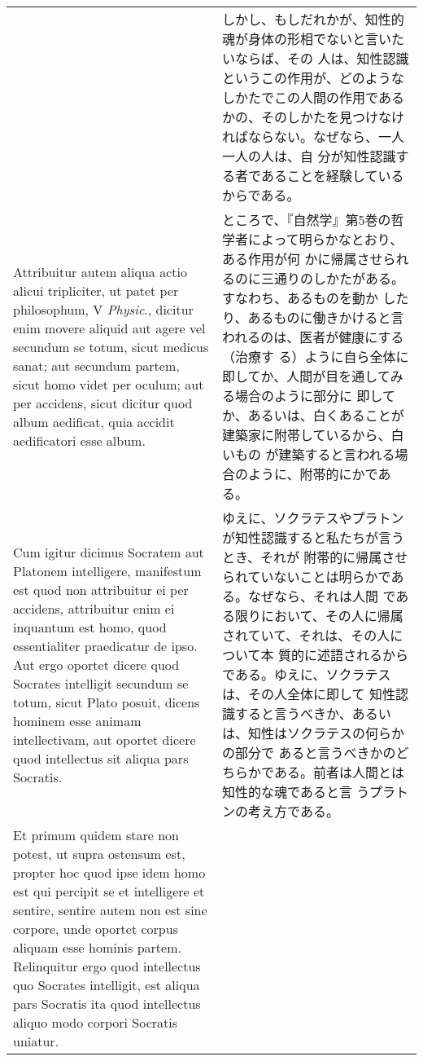 \documentclass[paper=a4paper,fontsize=10pt,jafontsize=9pt,titlepage]{jlreq}
\begin{document}
\begin{longtable}{p{21em}p{21em}}
 &

しかし、もしだれかが、知性的魂が身体の形相でないと言いたいならば、その
人は、知性認識というこの作用が、どのようなしかたでこの人間の作用である
かの、そのしかたを見つけなければならない。なぜなら、一人一人の人は、自
分が知性認識する者であることを経験しているからである。

 \\

 Attribuitur autem aliqua actio alicui tripliciter, ut patet per
 philosophum, V {\itshape Physic}., dicitur enim movere aliquid aut
 agere vel secundum se totum, sicut medicus sanat; aut secundum
 partem, sicut homo videt per oculum; aut per accidens, sicut dicitur
 quod album aedificat, quia accidit aedificatori esse album.
 
&

 ところで、『自然学』第5巻の哲学者によって明らかなとおり、ある作用が何
 かに帰属させられるのに三通りのしかたがある。すなわち、あるものを動か
 したり、あるものに働きかけると言われるのは、医者が健康にする（治療す
 る）ように自ら全体に即してか、人間が目を通してみる場合のように部分に
 即してか、あるいは、白くあることが建築家に附帯しているから、白いもの
 が建築すると言われる場合のように、附帯的にかである。

 
\\


 Cum igitur dicimus Socratem aut Platonem intelligere, manifestum est
 quod non attribuitur ei per accidens, attribuitur enim ei inquantum
 est homo, quod essentialiter praedicatur de ipso. Aut ergo oportet
 dicere quod Socrates intelligit secundum se totum, sicut Plato
 posuit, dicens hominem esse animam intellectivam, aut oportet dicere
 quod intellectus sit aliqua pars Socratis.
 
&

 ゆえに、ソクラテスやプラトンが知性認識すると私たちが言うとき、それが
 附帯的に帰属させられていないことは明らかである。なぜなら、それは人間
 である限りにおいて、その人に帰属されていて、それは、その人について本
 質的に述語されるからである。ゆえに、ソクラテスは、その人全体に即して
 知性認識すると言うべきか、あるいは、知性はソクラテスの何らかの部分で
 あると言うべきかのどちらかである。前者は人間とは知性的な魂であると言
 うプラトンの考え方である。
 
\\


 Et primum quidem stare non potest, ut supra ostensum est, propter hoc
 quod ipse idem homo est qui percipit se et intelligere et sentire,
 sentire autem non est sine corpore, unde oportet corpus aliquam esse
 hominis partem. Relinquitur ergo quod intellectus quo Socrates
 intelligit, est aliqua pars Socratis ita quod intellectus aliquo modo
 corpori Socratis uniatur.
 

\end{longtable}
\end{document}

